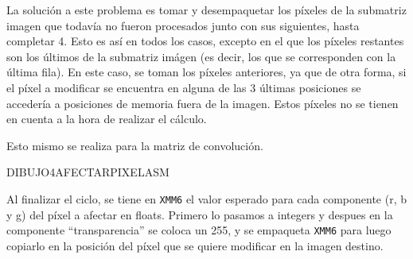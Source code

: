        La solución a este problema es tomar y desempaquetar los píxeles de la submatriz imagen que todavía no fueron procesados junto con sus siguientes, hasta completar 4. Esto es así en todos los casos, excepto en el que los píxeles restantes son los últimos de la submatriz imágen (es decir, los que se corresponden con la última fila). En este caso, se toman los píxeles anteriores, ya que de otra forma, si el píxel a modificar se encuentra en alguna de las 3 últimas posiciones se accedería a posiciones de memoria fuera de la imagen. Estos píxeles no se tienen en cuenta a la hora de realizar el cálculo. 
          
        Esto mismo se realiza para la matriz de convolución.
          
        DIBUJO4AFECTARPIXELASM

        Al finalizar el ciclo, se tiene en \texttt{XMM6} el valor esperado para cada componente (r, b y g) del píxel a afectar en floats. Primero lo pasamos a integers y despues en la componente “transparencia” se coloca un 255, y se empaqueta \texttt{XMM6} para luego copiarlo en la posición del píxel que se quiere modificar en la imagen destino. 